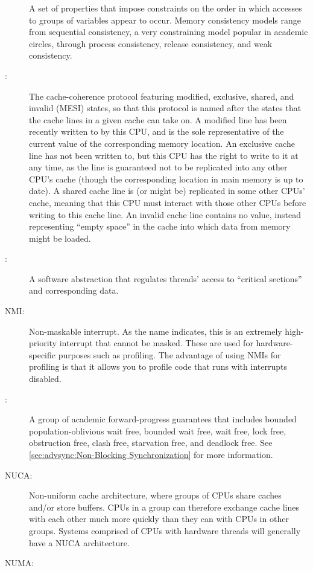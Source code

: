 \begin{description}
	A set of properties that impose constraints on the order in
	which accesses to groups of variables appear to occur.
	Memory consistency models range from sequential consistency,
	a very constraining model popular in academic circles, through
	process consistency, release consistency, and weak consistency.
\item[\IXGaltr{MESI Protocol}{MESI protocol}:]
	The
	cache-coherence protocol featuring
	modified, exclusive, shared, and invalid (MESI) states,
	so that this protocol is named after the states that the
	cache lines in a given cache can take on.
	A modified line has been recently written to by this CPU,
	and is the sole representative of the current value of
	the corresponding memory location.
	An exclusive cache line has not been written to, but this
	CPU has the right to write to it at any time, as the line
	is guaranteed not to be replicated into any other CPU's cache
	(though the corresponding location in main memory is up to date).
	A shared cache line is (or might be) replicated in some other
	CPUs' cache, meaning that this CPU must interact with those other
	CPUs before writing to this cache line.
	An invalid cache line contains no value, instead representing
	``empty space'' in the cache into which data from memory might
	be loaded.
\item[\IXG{Mutual-Exclusion Mechanism}:]
	A software abstraction that regulates threads' access to
	``critical sections'' and corresponding data.
\item[NMI:]
	Non-maskable interrupt.
	As the name indicates, this is an extremely high-priority
	interrupt that cannot be masked.
	These are used for hardware-specific purposes such as profiling.
	The advantage of using NMIs for profiling is that it allows you
	to profile code that runs with interrupts disabled.
\item[\IXG{Non-Blocking}:]
	A group of academic forward-progress guarantees that includes
	bounded population-oblivious wait free,
	bounded wait free,
	wait free,
	lock free,
	obstruction free,
	clash free,
	starvation free, and
	deadlock free.
	See \cref{sec:advsync:Non-Blocking Synchronization}
	for more information.
\item[NUCA:]
	Non-uniform cache architecture, where groups of CPUs share
	caches and/or store buffers.
	CPUs in a group can therefore exchange cache lines with each
	other much more quickly than they can with CPUs in other groups.
	Systems comprised of CPUs with hardware threads will generally
	have a NUCA architecture.
\item[NUMA:]

\end{description}
